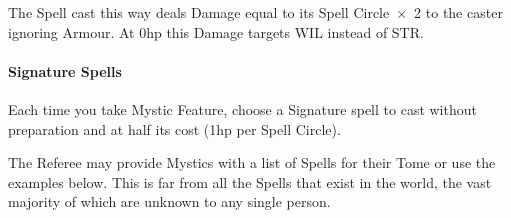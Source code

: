 \documentclass[itdr]{subfiles}
\begin{document}
The Spell cast this way deals Damage equal to its Spell Circle~$\times$~2 to the caster ignoring Armour. At 0hp this Damage targets WIL instead of STR.

\paragraph{Signature Spells}
Each time you take Mystic Feature, choose a Signature spell to cast without preparation and at half its cost (1hp per Spell Circle).

\vfill
\break

The Referee may provide Mystics with a list of Spells for their Tome or use the examples below. This is far from all the Spells that exist in the world, the vast majority of which are unknown to any single person.
\end{document}

